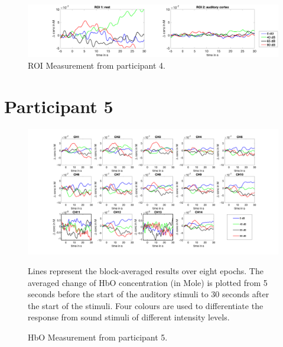 \begin{figure}[H]
  \centering
    \includegraphics[scale=.29]{bilder/ROI/sub_lin_s_HbO.png}
  \caption{ROI Measurement from participant  4.}
\end{figure}

\newpage



\section {Participant 5}
\begin{figure}[H]
  \centering
    \includegraphics[scale=.4]{bilder/HbO_Mole/sub_lukas_s_HbO.png}
  \caption{HbO Measurement from participant 5.}
  \label{fig:somesignal}
  \medskip
  \footnotesize {Lines represent the block-averaged results over eight epochs. The averaged change of HbO concentration (in Mole) is plotted from 5 seconds before the start of the auditory stimuli to 30 seconds after the start of the stimuli. Four colours are used to differentiate the response from sound stimuli of different intensity levels.}
\end{figure}


\newpage


